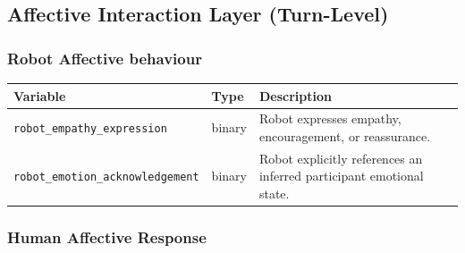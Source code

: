 \documentclass[
  letterpaper,
  DIV=11,
  numbers=noendperiod]{scrartcl}
\begin{document}
\subsection{Affective Interaction Layer
(Turn-Level)}\label{affective-interaction-layer-turn-level}

\subsubsection*{Robot Affective
behaviour}\label{robot-affective-behaviour}

\begin{longtable}[]{@{}
  >{\raggedright\arraybackslash}p{}
  >{\raggedright\arraybackslash}p{}
  >{\raggedright\arraybackslash}p{}@{}}
\toprule\noalign{}
\begin{minipage}[b]{\linewidth}\raggedright
Variable
\end{minipage} & \begin{minipage}[b]{\linewidth}\raggedright
Type
\end{minipage} & \begin{minipage}[b]{\linewidth}\raggedright
Description
\end{minipage} \\
\midrule\noalign{}
\endhead
\bottomrule\noalign{}
\endlastfoot
\texttt{robot\_empathy\_expression} & binary & Robot expresses empathy,
encouragement, or reassurance. \\
\texttt{robot\_emotion\_acknowledgement} & binary & Robot explicitly
references an inferred participant emotional state. \\
\end{longtable}

\subsubsection*{Human Affective
Response}\label{human-affective-response}
\end{document}
